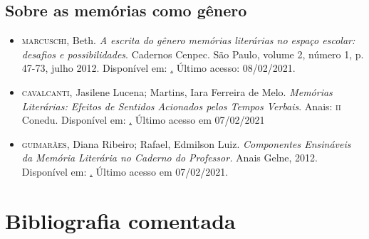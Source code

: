 \documentclass[11pt]{extarticle}
\begin{document}
\subsection{Sobre as memórias como gênero}

\begin{itemize}
\item \textsc{marcuschi}, Beth. \emph{A escrita do gênero memórias literárias no espaço escolar: desafios e possibilidades}. Cadernos Cenpec. São Paulo, volume
2, número 1, p. 47-73, julho 2012. Disponível em:
\href{http://www.cadernos.cenpec.org.br/cadernos/index.php/cadernos/article/view/92}
. Último acesso: 08/02/2021.

\item \textsc{cavalcanti}, Jasilene Lucena; Martins, Iara Ferreira de Melo.
\emph{Memórias Literárias: Efeitos de Sentidos Acionados pelos Tempos
Verbais}. Anais: \textsc{ii} Conedu. Disponível em:
\href{https://editorarealize.com.br/artigo/visualizar/16281}.
Último acesso em 07/02/2021

\item \textsc{guimarães}, Diana Ribeiro; Rafael, Edmilson Luiz. \emph{Componentes
Ensináveis da Memória Literária no Caderno do Professor.} Anais Gelne,
2012. Disponível em:
\href{http://gelne.com.br/arquivos/anais/gelne-2012/Arquivos/\%C3\%A1reas\%20tem\%C3\%A1ticas/Lingu\%C3\%ADstica\%20aplicada/Diana\%20e\%20Edmilson\%20-\%20COMPONENTES\%20ENSIN\%C3\%81VEIS\%20DA\%20MEM\%C3\%93RIA\%20LITER\%C3\%81RIA.pdf}. Último acesso em 07/02/2021.
\end{itemize}

\section{Bibliografia comentada}
\end{document}

